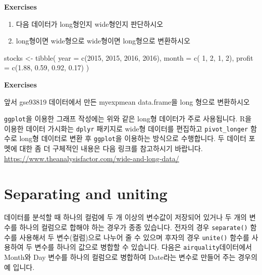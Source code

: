 \documentclass[
]{book}
\newenvironment{Shaded}{\begin{snugshade}}{\end{snugshade}}
\newcommand{\AttributeTok}[1]{\textcolor[rgb]{0.77,0.63,0.00}{#1}}
\newcommand{\DecValTok}[1]{\textcolor[rgb]{0.00,0.00,0.81}{#1}}
\newcommand{\FloatTok}[1]{\textcolor[rgb]{0.00,0.00,0.81}{#1}}
\newcommand{\FunctionTok}[1]{\textcolor[rgb]{0.00,0.00,0.00}{#1}}
\newcommand{\NormalTok}[1]{#1}
\newcommand{\OtherTok}[1]{\textcolor[rgb]{0.56,0.35,0.01}{#1}}
\providecommand{\tightlist}{%
  \setlength{\itemsep}{0pt}\setlength{\parskip}{0pt}}
\begin{document}
\textbf{Exercises}

\begin{enumerate}
\def\labelenumi{\arabic{enumi})}
\tightlist
\item
  다음 데이터가 long형인지 wide형인지 판단하시오\\
\item
  long형이면 wide형으로 wide형이면 long형으로 변환하시오
\end{enumerate}

\begin{Shaded}
\begin{Highlighting}[]
\NormalTok{stocks }\OtherTok{\textless{}{-}} \FunctionTok{tibble}\NormalTok{(}
  \AttributeTok{year   =} \FunctionTok{c}\NormalTok{(}\DecValTok{2015}\NormalTok{, }\DecValTok{2015}\NormalTok{, }\DecValTok{2016}\NormalTok{, }\DecValTok{2016}\NormalTok{),}
  \AttributeTok{month  =} \FunctionTok{c}\NormalTok{(   }\DecValTok{1}\NormalTok{,    }\DecValTok{2}\NormalTok{,     }\DecValTok{1}\NormalTok{,    }\DecValTok{2}\NormalTok{),}
  \AttributeTok{profit =} \FunctionTok{c}\NormalTok{(}\FloatTok{1.88}\NormalTok{, }\FloatTok{0.59}\NormalTok{, }\FloatTok{0.92}\NormalTok{, }\FloatTok{0.17}\NormalTok{)}
\NormalTok{)}
\end{Highlighting}
\end{Shaded}

\textbf{Exercises}

앞서 gse93819 데이터에서 만든 myexpmean data.frame을 long 형으로 변환하시오

\texttt{ggplot}을 이용한 그래프 작성에는 위와 같은 long형 데이터가 주로 사용됩니다. R을 이용한 데이터 가시화는 \texttt{dplyr} 패키지로 wide형 데이터를 편집하고 \texttt{pivot\_longer} 함수로 long형 데이터로 변환 후 \texttt{ggplot}을 이용하는 방식으로 수행합니다. 두 데이터 포멧에 대한 좀 더 구체적인 내용은 다음 링크를 참고하시기 바랍니다. \url{https://www.theanalysisfactor.com/wide-and-long-data/}

\hypertarget{separating-and-uniting}{%
\section{Separating and uniting}\label{separating-and-uniting}}

데이터를 분석할 때 하나의 컬럼에 두 개 이상의 변수값이 저장되어 있거나 두 개의 변수를 하나의 컬럼으로 합해야 하는 경우가 종종 있습니다. 전자의 경우 \texttt{separate()} 함수를 사용해서 두 변수(컬럼)으로 나누어 줄 수 있으며 후자의 경우 \texttt{unite()} 함수를 사용하여 두 변수를 하나의 값으로 병합할 수 있습니다. 다음은 \texttt{airquality}데이터에서 Month와 Day 변수를 하나의 컬럼으로 병합하여 Date라는 변수로 만들어 주는 경우의 예 입니다.
\end{document}
